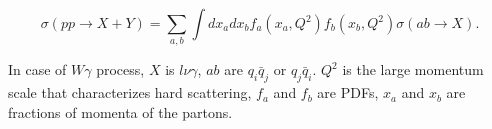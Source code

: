 \begin{equation}\label{eq:ppCS_general}
  \sigma(pp \rightarrow X+Y)= \sum_{a,b} \int dx_a dx_b f_a(x_a,Q^2) f_b(x_b, Q^2) \sigma(ab \rightarrow X).
\end{equation}

In case of $W\gamma$ process, $X$ is $l \nu \gamma$, $ab$ are $q_i \bar{q}_j$ or $q_j \bar{q}_i$. $Q^2$ is the large momentum scale that characterizes hard scattering, $f_a$ and $f_b$ are PDFs, $x_a$ and $x_b$ are fractions of momenta of the partons.\\
